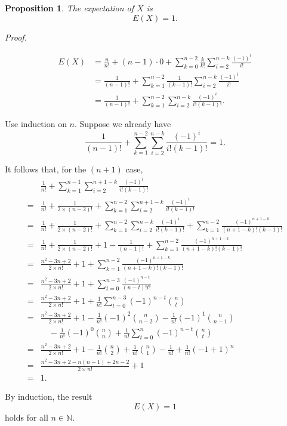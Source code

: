 \documentclass[11pt,a4paper]{article}
\newtheorem{proposition}{Proposition}
\newenvironment{paperproof}
  {\par\noindent\textit{Proof.}\par\smallskip}
  {\par}
\begin{document}
\newpage

\begin{proposition}
The expectation of \(X\) is
\[
  E(X)=1.
\]
\end{proposition}

\begin{paperproof}
\begin{align*}
  E(X)
    &=\frac{n}{n!}+(n-1)\cdot 0
      +\sum_{k=0}^{n-2}\frac{k}{k!}
       \sum_{i=2}^{n-k}\frac{(-1)^i}{i!}\\
    &=\frac{1}{(n-1)!}
      +\sum_{k=1}^{n-2}\frac{1}{(k-1)!}
       \sum_{i=2}^{n-k}\frac{(-1)^i}{i!}\\
    &=\frac{1}{(n-1)!}
      +\sum_{k=1}^{n-2}\sum_{i=2}^{n-k}
       \frac{(-1)^i}{i!(k-1)!}.
\end{align*}

Use induction on \(n\). Suppose we already have
\[
  \frac{1}{(n-1)!}
  +\sum_{k=1}^{n-2}\sum_{i=2}^{n-k}
   \frac{(-1)^i}{i!(k-1)!}=1.
\]

\newpage

It follows that, for the \((n+1)\) case,
\begingroup
\small
\setlength{\jot}{6pt}
\begin{align*}
  &\frac{1}{n!}
   +\sum_{k=1}^{n-1}\sum_{i=2}^{n+1-k}
    \frac{(-1)^i}{i!(k-1)!}\\
  ={}&\frac{1}{n!}+\frac{1}{2\times(n-2)!}
   +\sum_{k=1}^{n-2}\sum_{i=2}^{n+1-k}
    \frac{(-1)^i}{i!(k-1)!}\\
  ={}&\frac{1}{n!}+\frac{1}{2\times(n-2)!}
   +\sum_{k=1}^{n-2}\sum_{i=2}^{n-k}
    \frac{(-1)^i}{i!(k-1)!}
   +\sum_{k=1}^{n-2}
    \frac{(-1)^{n+1-k}}{(n+1-k)!(k-1)!}\\
  ={}&\frac{1}{n!}+\frac{1}{2\times(n-2)!}
   +1-\frac{1}{(n-1)!}
   +\sum_{k=1}^{n-2}
    \frac{(-1)^{n+1-k}}{(n+1-k)!(k-1)!}\\
  ={}&\frac{n^2-3n+2}{2\times n!}+1
   +\sum_{k=1}^{n-2}
    \frac{(-1)^{n+1-k}}{(n+1-k)!(k-1)!}\\
  ={}&\frac{n^2-3n+2}{2\times n!}+1
   +\sum_{t=0}^{n-3}\frac{(-1)^{n-t}}{(n-t)!t!}\\
  ={}&\frac{n^2-3n+2}{2\times n!}+1
   +\frac{1}{n!}\sum_{t=0}^{n-3}(-1)^{n-t}\binom{n}{t}\\
  ={}&\frac{n^2-3n+2}{2\times n!}+1
   -\frac{1}{n!}(-1)^2\binom{n}{n-2}
   -\frac{1}{n!}(-1)^1\binom{n}{n-1}\\[-0.1em]
   &\quad
   -\frac{1}{n!}(-1)^0\binom{n}{n}
   +\frac{1}{n!}\sum_{t=0}^{n}(-1)^{n-t}\binom{n}{t}\\
  ={}&\frac{n^2-3n+2}{2\times n!}+1
   -\frac{1}{n!}\binom{n}{2}
   +\frac{1}{n!}\binom{n}{1}
   -\frac{1}{n!}
   +\frac{1}{n!}(-1+1)^n\\
  ={}&\frac{n^2-3n+2-n(n-1)+2n-2}{2\times n!}+1\\
  ={}&1.
\end{align*}
\endgroup

By induction, the result
\[
  E(X)=1
\]
holds for all \(n\in\mathbb{N}\).
\end{paperproof}
\end{document}
